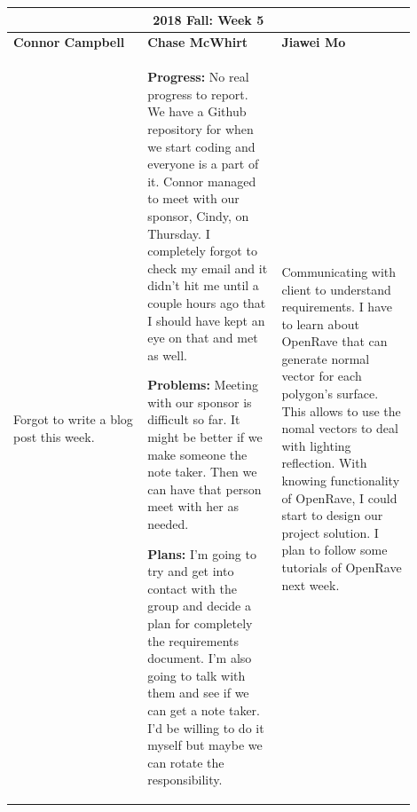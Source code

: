 \documentclass[10pt,journal,compsoc, draftclsnofoot,onecolumn]{IEEEtran}
\begin{document}
\begin{center}
\begin{tabular}{|p{0.3\linewidth}|p{0.3\linewidth}|p{0.3\linewidth}|}
\hline
\multicolumn{3}{|c|}{\textbf{2018 Fall: Week 5}} \\
\hline
\textbf{Connor Campbell} & \textbf{Chase McWhirt} & \textbf{Jiawei Mo} \\ [0.5ex]
\hline\hline

Forgot to write a blog post this week.
&
\textbf{Progress:} No real progress to report.
We have a Github repository for when we start coding and everyone is a part of it.
Connor managed to meet with our sponsor, Cindy, on Thursday.
I completely forgot to check my email and it didn't hit me until a couple hours ago that I should have kept an eye on that and met as well.

\textbf{Problems:} Meeting with our sponsor is difficult so far.
It might be better if we make someone the note taker.
Then we can have that person meet with her as needed.

\textbf{Plans:} I'm going to try and get into contact with the group and decide a plan for completely the requirements document.
I'm also going to talk with them and see if we can get a note taker.
I'd be willing to do it myself but maybe we can rotate the responsibility.
&
Communicating with client to understand requirements. I have to learn about OpenRave that can generate normal vector for each polygon's surface. This allows to use the nomal vectors to deal with lighting reflection. With knowing functionality of OpenRave, I could start to design our project solution. I plan to follow some tutorials of OpenRave next week. 
\\ \hline
\end{tabular}
\end{center}
\end{document}
